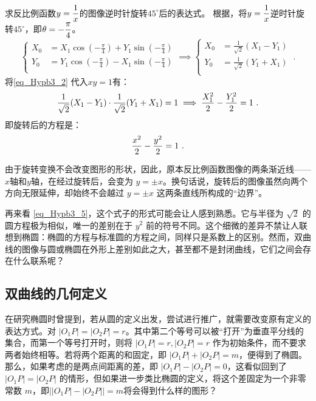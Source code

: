 \begin{example}{求反比例函数$\displaystyle y={1\over x}$的图像逆时针旋转$45^\circ$后的表达式。}\label{ex_Hypb3_1}
根据，将$\displaystyle y={1\over x}$逆时针旋转$45^\circ$，即$\displaystyle\theta=-{\pi\over4}$。
\begin{equation}\label{eq_Hypb3_2}
\begin{cases}
\displaystyle
X_0&=X_1 \cos \left(-{\displaystyle\frac{\pi}{4}}\right) + Y_1 \sin  \left(-{\displaystyle\frac{\pi}{4}}\right)\\
Y_0&=Y_1 \cos  \left(-{\displaystyle\frac{\pi}{4}}\right) - X_1 \sin  \left(-{\displaystyle\frac{\pi}{4}}\right)\\
\end{cases}\implies
\begin{cases}
X_0&={\displaystyle\frac{1}{\sqrt{2}}}(X_1 - Y_1)\\
Y_0&={\displaystyle\frac{1}{\sqrt{2}}}(Y_1+ X_1) \\
\end{cases}~.
\end{equation}
将\autoref{eq_Hypb3_2} 代入$xy=1$有：
\begin{equation}
\displaystyle
{1\over\sqrt{2}}(X_1 - Y_1)\cdot{1\over\sqrt{2}}(Y_1+ X_1)=1\implies {X_1^2\over2}- {Y_1^2\over2}=1~.
\end{equation}
即旋转后的方程是：
\begin{equation}\label{eq_Hypb3_5}
{x^2\over2}- {y^2\over2}=1~.
\end{equation}
\end{example}


由于旋转变换不会改变图形的形状，因此，原本反比例函数图像的两条渐近线——$x$轴和$y$轴，在经过旋转后，会变为 $y = \pm x$。换句话说，旋转后的图像虽然向两个方向无限延伸，却始终不会越过 $y = \pm x$ 这两条直线所构成的“边界”。

再来看 \autoref{eq_Hypb3_5}，这个式子的形式可能会让人感到熟悉。它与半径为 $\sqrt{2}$ 的圆方程极为相似，唯一的差别在于 $y^2$ 前的符号不同。这个细微的差异不禁让人联想到椭圆：椭圆的方程与标准圆的方程之间，同样只是系数上的区别。然而，双曲线的图像与圆或椭圆在外形上差别如此之大，甚至都不是封闭曲线，它们之间会存在什么联系呢？

\subsection{双曲线的几何定义}

在研究椭圆时曾提到，若从圆的定义出发，尝试进行推广，就需要改变原有定义的表达方式。对 $|O_1P| = |O_2P| = r$。其中第二个等号可以被“打开”为垂直平分线的集合，而第一个等号打开时，则将 $|O_1P| = r, |O_2P| = r$ 作为初始条件，而不要求两者始终相等。若将两个距离的和固定，即 $|O_1P| + |O_2P| = m$，便得到了椭圆。那么，如果考虑的是两点间距离的差，即 $|O_1P| - |O_2P| = 0$，这看似回到了 $|O_1P| = |O_2P|$ 的情形，但如果进一步类比椭圆的定义，将这个差固定为一个非零常数 $m$，即$\left||O_1P| - |O_2P|\right| = m$将会得到什么样的图形？

